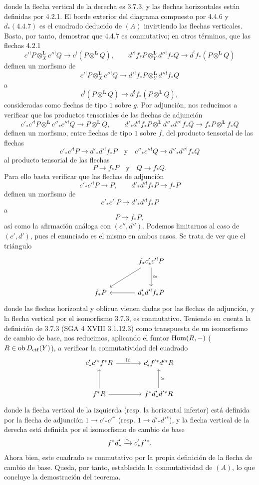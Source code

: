 \begin{prooftext}[Demostración]
donde la flecha vertical de la derecha es 3.7.3, y las flechas horizontales están definidas por 4.2.1. El borde exterior del diagrama compuesto por 4.4.6 y $d_*(4.4.7)$ es el cuadrado deducido de $(A)$ invirtiendo las flechas verticales. Basta, por tanto, demostrar que 4.4.7 es conmutativo; en otros términos, que las flechas 4.2.1
\[
c'{}^!P\otimes_X^{\mathbf L}c''{}^!Q\longrightarrow c^!(P\otimes^{\mathbf L}Q),\qquad
d'{}^!f_*P\otimes_Y^{\mathbf L}d''{}^!f_*Q\longrightarrow d^!f_*(P\otimes^{\mathbf L}Q)
\]
definen un morfismo de
\[
c'{}^!P\otimes_X^{\mathbf L}c''{}^!Q\longrightarrow d'{}^!f_*P\otimes_Y^{\mathbf L}d''{}^!f_*Q
\]
a
\[
c^!(P\otimes^{\mathbf L}Q)\longrightarrow d^!f_*(P\otimes^{\mathbf L}Q),
\]
consideradas como flechas de tipo $1$ sobre $g$. Por adjunción, nos reducimos a verificar que los productos tensoriales de las flechas de adjunción
\[
c'_*c'{}^!P\otimes^{\mathbf L}c''_*c''{}^!Q\longrightarrow P\otimes^{\mathbf L}Q,
\qquad
d'_*d'{}^!f_*P\otimes^{\mathbf L}d''_*d''{}^!f_*Q
\longrightarrow f_*P\otimes^{\mathbf L}f_*Q
\]
definen un morfismo, entre flechas de tipo $1$ sobre $f$, del producto tensorial de las flechas
\[
c'_*c'{}^!P\longrightarrow d'_*d'{}^!f_*P\quad\text{y}\quad
c''_*c''{}^!Q\longrightarrow d''_*d''{}^!f_*Q
\]
al producto tensorial de las flechas
\[
P\longrightarrow f_*P\quad\text{y}\quad Q\longrightarrow f_*Q.
\]
Para ello basta verificar que las flechas de adjunción
\[
c'_*c'{}^!P\longrightarrow P,\qquad d'_*d'{}^!f_*P\longrightarrow f_*P
\]
definen un morfismo de
\[
c'_*c'{}^!P\longrightarrow d'_*d'{}^!f_*P
\]
a
\[
P\longrightarrow f_*P,
\]
así como la afirmación análoga con $(c'',d'')$. Podemos limitarnos al caso de $(c',d')$, pues el enunciado es el mismo en ambos casos. Se trata de ver que el triángulo
\[
\begin{tikzcd}[column sep=large,row sep=large]
& f_*c'_*c'{}^!P \arrow[d,"\simeq"]\arrow[dl]\\
f_*P & d'_*d'{}^!f_*P\arrow[l]
\end{tikzcd}
\]
donde las flechas horizontal y oblicua vienen dadas por las flechas de adjunción, y la flecha vertical por el isomorfismo 3.7.3, es conmutativo. Teniendo en cuenta la definición de 3.7.3 (SGA 4 XVIII 3.1.12.3) como transpuesta de un isomorfismo de cambio de base, nos reducimos, aplicando el funtor $\operatorname{Hom}(R,-)$ ($R\in\operatorname{ob}D_{\mathrm{ctf}}(Y)$), a verificar la conmutatividad del cuadrado
\[
\begin{tikzcd}[column sep=large,row sep=large]
c'_*c'{}^*f^*R \arrow[r,"\Id"] &
c'_*f'{}^*d'{}^*R\\
f^*R \arrow[u] \arrow[r] &
f^*d'_*d'{}^*R\arrow[u,"\simeq"']
\end{tikzcd}
\]
donde la flecha vertical de la izquierda (resp. la horizontal inferior) está definida por la flecha de adjunción $1\longrightarrow c'_*c'{}^*$ (resp. $1\longrightarrow d'_*d'{}^*$), y la flecha vertical de la derecha está definida por el isomorfismo de cambio de base
\[
f^*d'_*\xrightarrow{\sim} c'_*f'{}^*.
\]
Ahora bien, este cuadrado es conmutativo por la propia definición de la flecha de cambio de base. Queda, por tanto, establecida la conmutatividad de $(A)$, lo que concluye la demostración del teorema.
\end{prooftext}
